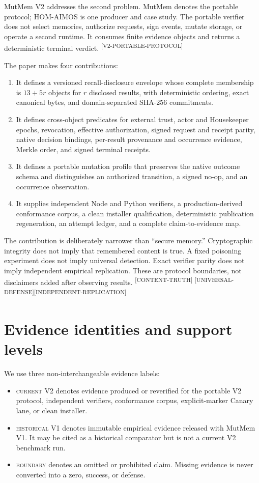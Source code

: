 \documentclass[10pt]{article}
\newcommand{\evidence}[1]{\textsuperscript{\scriptsize\textsf{[#1]}}}
\newcommand{\currentv}{\textsc{current V2}}
\newcommand{\historicalv}{\textsc{historical V1}}
\newcommand{\boundary}{\textsc{boundary}}
\begin{document}
MutMem V2 addresses the second problem. MutMem denotes the portable protocol;
HOM-AIMOS is one producer and case study. The portable verifier does not select
memories, authorize requests, sign events, mutate storage, or operate a second
runtime. It consumes finite evidence objects and returns a deterministic terminal
verdict. \evidence{V2-PORTABLE-PROTOCOL}

The paper makes four contributions:

\begin{enumerate}
  \item It defines a versioned recall-disclosure envelope whose complete
  membership is $13+5r$ objects for $r$ disclosed results, with deterministic
  ordering, exact canonical bytes, and domain-separated SHA-256 commitments.
  \item It defines cross-object predicates for external trust, actor and
  Housekeeper epochs, revocation, effective authorization, signed request and
  receipt parity, native decision bindings, per-result provenance and occurrence
  evidence, Merkle order, and signed terminal receipts.
  \item It defines a portable mutation profile that preserves the native outcome
  schema and distinguishes an authorized transition, a signed no-op, and an
  occurrence observation.
  \item It supplies independent Node and Python verifiers, a production-derived
  conformance corpus, a clean installer qualification, deterministic publication
  regeneration, an attempt ledger, and a complete claim-to-evidence map.
\end{enumerate}

The contribution is deliberately narrower than ``secure memory.'' Cryptographic
integrity does not imply that remembered content is true. A fixed poisoning
experiment does not imply universal detection. Exact verifier parity does not
imply independent empirical replication. These are protocol boundaries, not
disclaimers added after observing results. \evidence{CONTENT-TRUTH}
\evidence{UNIVERSAL-DEFENSE}\evidence{INDEPENDENT-REPLICATION}

\section{Evidence identities and support levels}

We use three non-interchangeable evidence labels:

\begin{itemize}
  \item \currentv{} denotes evidence produced or reverified for the portable V2
  protocol, independent verifiers, conformance corpus, explicit-marker Canary
  lane, or clean installer.
  \item \historicalv{} denotes immutable empirical evidence released with
  MutMem V1. It may be cited as a historical comparator but is not a current
  V2 benchmark run.
  \item \boundary{} denotes an omitted or prohibited claim. Missing evidence is
  never converted into a zero, success, or defense.
\end{itemize}
\end{document}
